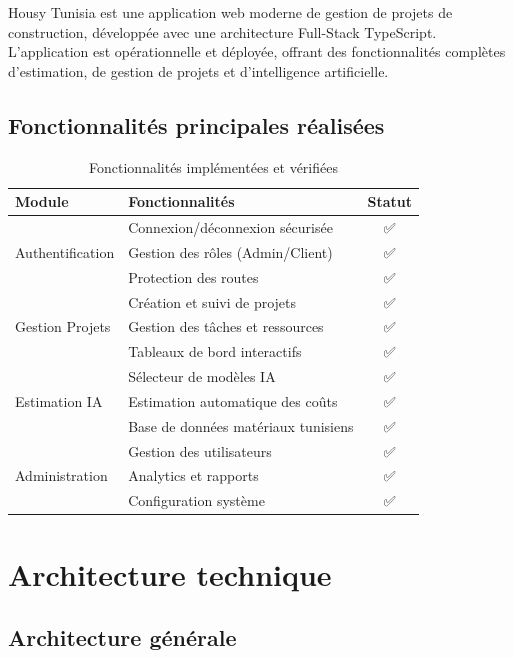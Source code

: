 \documentclass[12pt, a4paper]{report}
\begin{document}
Housy Tunisia est une application web moderne de gestion de projets de construction, développée avec une architecture Full-Stack TypeScript. L'application est opérationnelle et déployée, offrant des fonctionnalités complètes d'estimation, de gestion de projets et d'intelligence artificielle.

\subsection{Fonctionnalités principales réalisées}

\begin{table}[H]
\centering
\caption{Fonctionnalités implémentées et vérifiées}
\begin{tabular}{|l|p{8cm}|c|}
\hline
\textbf{Module} & \textbf{Fonctionnalités} & \textbf{Statut} \\
\hline
\multirow{3}{*}{Authentification} 
& Connexion/déconnexion sécurisée & ✅ \\
& Gestion des rôles (Admin/Client) & ✅ \\
& Protection des routes & ✅ \\
\hline
\multirow{3}{*}{Gestion Projets} 
& Création et suivi de projets & ✅ \\
& Gestion des tâches et ressources & ✅ \\
& Tableaux de bord interactifs & ✅ \\
\hline
\multirow{3}{*}{Estimation IA} 
& Sélecteur de modèles IA & ✅ \\
& Estimation automatique des coûts & ✅ \\
& Base de données matériaux tunisiens & ✅ \\
\hline
\multirow{3}{*}{Administration} 
& Gestion des utilisateurs & ✅ \\
& Analytics et rapports & ✅ \\
& Configuration système & ✅ \\
\hline
\end{tabular}
\end{table}

\section{Architecture technique}

\subsection{Architecture générale}
\end{document}
